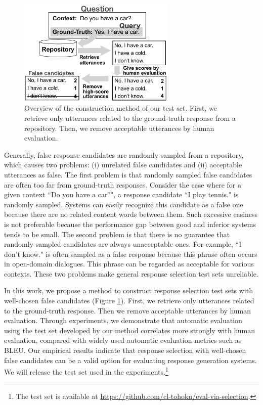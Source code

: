 \documentclass[11pt,a4paper]{article}
\begin{document}
\begin{figure}[t]
\begin{center}
\includegraphics[width=75mm]{figure1.pdf}
\end{center}
\caption{
Overview of the construction method of our test set.
First, we retrieve only utterances related to the ground-truth response from a repository.
Then, we remove acceptable utterances by human evaluation.}
\label{fig:figure1}
\end{figure}

%
%
Generally, false response candidates are randomly sampled from a repository\cite{lowe-etal-2015-ubuntu,gunasekara-etal-2019-dstc7}, which causes two problems: (i) unrelated false candidates and (ii) acceptable utterances as false.
The first problem is that randomly sampled false candidates are often too far from ground-truth responses.
Consider the case where for a given context ``Do you have a car?", a response candidate ``I play tennis." is randomly sampled.
Systems can easily recognize this candidate as a false one because there are no related content words between them.
Such excessive easiness is not preferable because the performance gap between good and inferior systems tends to be small.
The second problem is that there is no guarantee that randomly sampled candidates are always unacceptable ones.
For example, ``I don't know." is often sampled as a false response because this phrase often occurs in open-domain dialogues.
This phrase can be regarded as acceptable for various contexts.
These two problems make general response selection test sets unreliable.

%
In this work, we propose a method to construct response selection test sets with well-chosen false candidates (Figure \ref{fig:figure1}).
First, we retrieve only utterances related to the ground-truth response.
Then we remove acceptable utterances by human evaluation.
Through experiments, we demonstrate that automatic evaluation using the test set developed by our method correlates more strongly with human evaluation, compared with widely used automatic evaluation metrics such as BLEU.
Our empirical results indicate that response selection with well-chosen false candidates can be a valid option for evaluating response generation systems.
We will release the test set used in the experiments.\footnote{The test set is available at \url{https://github.com/cl-tohoku/eval-via-selection}.}
\end{document}
